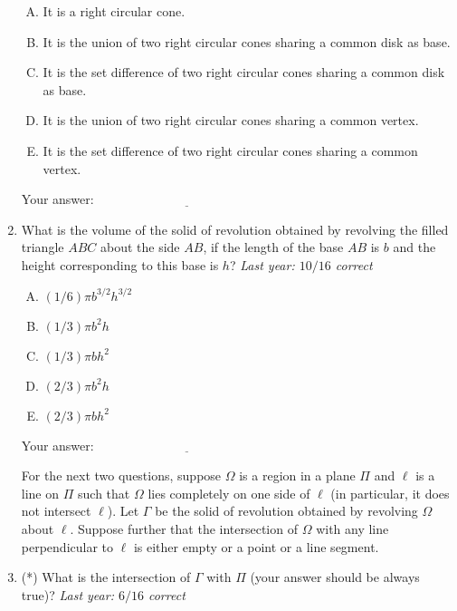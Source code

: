 \documentclass[10pt]{amsart}
\begin{document}
\begin{enumerate}
  \begin{enumerate}[(A)]
  \item It is a right circular cone.
  \item It is the union of two right circular cones sharing a common
    disk as base.
  \item It is the set difference of two right circular cones sharing a
    common disk as base.
  \item It is the union of two right circular cones sharing a common
    vertex.
  \item It is the set difference of two right circular cones sharing a
    common vertex.
  \end{enumerate}

  
  \vspace{1in}
Your answer: $\underline{\qquad\qquad\qquad\qquad\qquad\qquad\qquad}$
  \vspace{1in}

\item What is the volume of the solid of revolution obtained by
  revolving the filled triangle $ABC$ about the side $AB$, if the
  length of the base $AB$ is $b$ and the height corresponding to this
  base is $h$? {\em Last year: $10/16$ correct}

  \begin{enumerate}[(A)]
  \item $(1/6) \pi b^{3/2}h^{3/2}$
  \item $(1/3) \pi b^2h$
  \item $(1/3) \pi bh^2$
  \item $(2/3) \pi b^2h$
  \item $(2/3) \pi bh^2$
  \end{enumerate}
  
  Your answer: $\underline{\qquad\qquad\qquad\qquad\qquad\qquad\qquad}$
  \vspace{1in}

  For the next two questions, suppose $\Omega$ is a region in a plane
  $\Pi$ and $\ell$ is a line on $\Pi$ such that $\Omega$ lies
  completely on one side of $\ell$ (in particular, it does not
  intersect $\ell$). Let $\Gamma$ be the solid of revolution obtained
  by revolving $\Omega$ about $\ell$. Suppose further that the
  intersection of $\Omega$ with any line perpendicular to $\ell$ is
  either empty or a point or a line segment.
\item (*) What is the intersection of $\Gamma$ with $\Pi$ (your answer
  should be always true)? {\em Last year: $6/16$ correct}


\end{enumerate}
\end{document}
